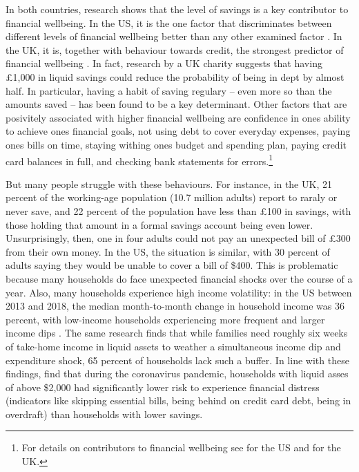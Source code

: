 In both countries, research shows that the level of savings is a key
contributor to financial wellbeing. In the US, it is the one factor that
discriminates between different levels of financial wellbeing better than any
other examined factor \citep{cfpb2017financial}. In the UK, it is, together
with behaviour towards credit, the strongest predictor of financial wellbeing
\citep{mps2018building}. In fact, research by a UK charity suggests that having
\pounds1,000 in liquid savings could reduce the probability of being in dept by
almost half. In particular, having a habit of saving regulary -- even more so
than the amounts saved -- has been found to be a key determinant. Other
factors that are posivitely associated with higher financial wellbeing are
confidence in ones ability to achieve ones financial goals, not using debt to
cover everyday expenses, paying ones bills on time, staying withing ones budget
and spending plan, paying credit card balances in full, and checking bank
statements for errors.\footnote{For details on contributors to financial
wellbeing see \citep{cfpb2017financial} for the US and \citet{mps2018building}
for the UK.}

But many people struggle with these behaviours. For instance, in the UK, 21
percent of the working-age population (10.7 million adults) report to raraly or
never save, and 22 percent of the population have less than \pounds100 in
savings, with those holding that amount in a formal savings account being even
lower. Unsurprisingly, then, one in four adults could not pay an unexpected
bill of \pounds300 from their own money. In the US, the situation is similar,
with 30 percent of adults saying they would be unable to cover a bill of \$400.
This is problematic because many households do face unexpected financial shocks
over the course of a year. Also, many households experience high income
volatility: in the US between 2013 and 2018, the median month-to-month change
in household income was 36 percent, with low-income households experiencing
more frequent and larger income dips \citep{jpmorgan2019weathering}. The same
research finds that while families need roughly six weeks of take-home income
in liquid assets to weather a simultaneous income dip and expenditure shock, 65
percent of households lack such a buffer. In line with these findings,
\citet{roll2020income} find that during the coronavirus pandemic, households
with liquid asses of above \$2,000 had significantly lower risk to experience
financial distress (indicators like skipping essential bills, being behind on
credit card debt, being in overdraft) than households with lower savings.

